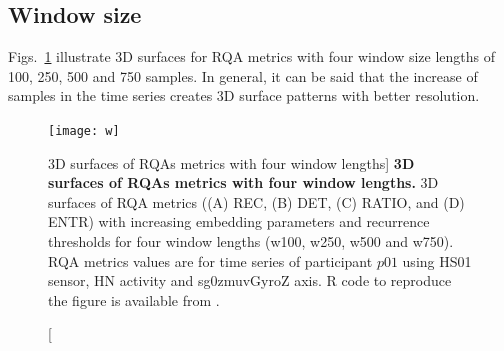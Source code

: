 \subsection{Window size}
Figs.~\ref{fig:topo_windows} illustrate 3D surfaces for RQA metrics 
with four window size lengths of 100, 250, 500 and 750 samples.
In general, it can be said that the increase of samples in the time series 
creates 3D surface patterns with better resolution.
\begin{figure}
\centering
\texttt{[image: w]}
    \caption
	[3D surfaces of RQAs metrics with four window lengths]{
	{\bf 3D surfaces of RQAs metrics with four window lengths.}
	3D surfaces of RQA metrics ((A) REC, (B) DET, (C) RATIO, and (D) ENTR) 
	with increasing embedding 
	parameters and recurrence thresholds for four window 
	lengths (w100, w250, w500 and  w750).
	RQA metrics values are for time series of participant $p01$ 
	using HS01 sensor, HN activity and sg0zmuvGyroZ axis.
	R code to reproduce the figure is available from \cite{hwum2018}.
        }
\label{fig:topo_windows}
\end{figure}




\newpage
